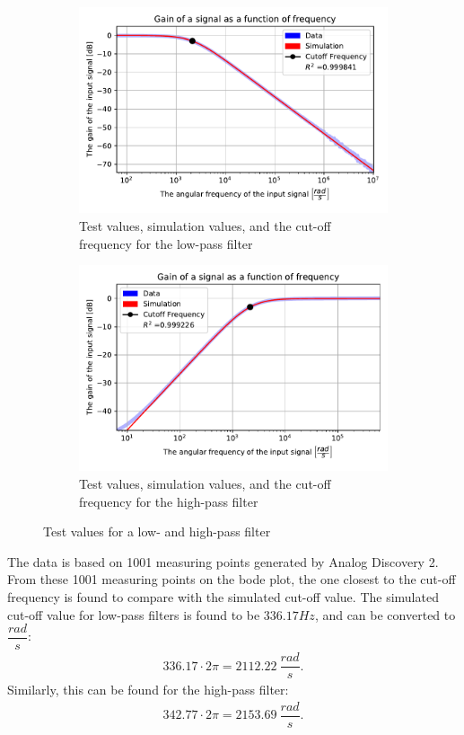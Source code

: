 \begin{figure}[H]
\centering
	\begin{subfigure}[b]{0.49\textwidth}
		\includegraphics[width=\textwidth]{fig/img/LPF_exp.pdf}
    		\caption{Test values, simulation values, and the cut-off frequency for the low-pass filter}
    		\label{fig:lpf:exp}
	\end{subfigure}
	\begin{subfigure}[b]{0.49\textwidth}
		\includegraphics[width=\textwidth]{fig/img/HPF_exp.pdf}
    		\caption{Test values, simulation values, and the cut-off frequency for the high-pass filter}
    		\label{fig:hpf:exp}
	\end{subfigure}
	\caption{Test values for a low- and high-pass filter}
\end{figure}
\noindent The data is based on 1001 measuring points generated by Analog Discovery 2. From these 1001 measuring points on the bode plot, the one closest to the cut-off frequency is found to compare with the simulated cut-off value. The simulated cut-off value for low-pass filters is found to be $336.17 Hz$, and can be converted to $\dfrac{rad}{s}$:
\begin{align}
336.17 \cdot 2 \pi = 2112.22 \ \dfrac{rad}{s}.
 \label{lpf:cut}
\end{align}
Similarly, this can be found for the high-pass filter:
\begin{align}
342.77 \cdot 2 \pi = 2153.69 \ \dfrac{rad}{s}.
 \label{hpf:cut}
\end{align}
